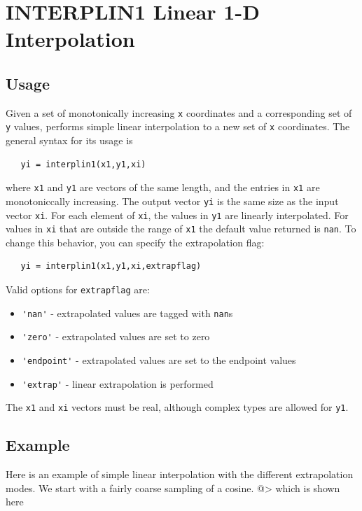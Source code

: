 \section{INTERPLIN1 Linear 1-D Interpolation}

\subsection{Usage}

Given a set of monotonically increasing \verb|x| coordinates and a 
corresponding set of \verb|y| values, performs simple linear 
interpolation to a new set of \verb|x| coordinates. The general syntax
for its usage is
\begin{verbatim}
   yi = interplin1(x1,y1,xi)
\end{verbatim}
where \verb|x1| and \verb|y1| are vectors of the same length, and the entries
in \verb|x1| are monotoniccally increasing.  The output vector \verb|yi| is
the same size as the input vector \verb|xi|.  For each element of \verb|xi|,
the values in \verb|y1| are linearly interpolated.  For values in \verb|xi| 
that are outside the range of \verb|x1| the default value returned is
\verb|nan|.  To change this behavior, you can specify the extrapolation
flag:
\begin{verbatim}
   yi = interplin1(x1,y1,xi,extrapflag)
\end{verbatim}
Valid options for \verb|extrapflag| are:
\begin{itemize}
\item  \verb|'nan'| - extrapolated values are tagged with \verb|nan|s

\item  \verb|'zero'| - extrapolated values are set to zero

\item  \verb|'endpoint'| - extrapolated values are set to the endpoint values 

\item  \verb|'extrap'| - linear extrapolation is performed

\end{itemize}
The \verb|x1| and \verb|xi| vectors must be real, although complex types
are allowed for \verb|y1|.
\subsection{Example}

Here is an example of simple linear interpolation with the different
extrapolation modes.  We start with a fairly coarse sampling of a 
cosine.
@>
which is shown here


